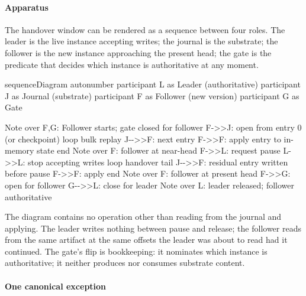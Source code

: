 \documentclass[
]{article}
\newenvironment{Shaded}{}{}
\newcommand{\NormalTok}[1]{#1}
\begin{document}
\paragraph{Apparatus}\label{apparatus}

The handover window can be rendered as a sequence between four roles.
The leader is the live instance accepting writes; the journal is the
substrate; the follower is the new instance approaching the present
head; the gate is the predicate that decides which instance is
authoritative at any moment.

\begin{Shaded}
\begin{Highlighting}[]
\NormalTok{sequenceDiagram}
\NormalTok{    autonumber}
\NormalTok{    participant L as Leader (authoritative)}
\NormalTok{    participant J as Journal (substrate)}
\NormalTok{    participant F as Follower (new version)}
\NormalTok{    participant G as Gate}

\NormalTok{    Note over F,G: Follower starts; gate closed for follower}
\NormalTok{    F{-}\textgreater{}\textgreater{}J: open from entry 0 (or checkpoint)}
\NormalTok{    loop bulk replay}
\NormalTok{        J{-}{-}\textgreater{}\textgreater{}F: next entry}
\NormalTok{        F{-}\textgreater{}\textgreater{}F: apply entry to in{-}memory state}
\NormalTok{    end}
\NormalTok{    Note over F: follower at near{-}head}
\NormalTok{    F{-}\textgreater{}\textgreater{}L: request pause}
\NormalTok{    L{-}\textgreater{}\textgreater{}L: stop accepting writes}
\NormalTok{    loop handover tail}
\NormalTok{        J{-}{-}\textgreater{}\textgreater{}F: residual entry written before pause}
\NormalTok{        F{-}\textgreater{}\textgreater{}F: apply}
\NormalTok{    end}
\NormalTok{    Note over F: follower at present head}
\NormalTok{    F{-}\textgreater{}\textgreater{}G: open for follower}
\NormalTok{    G{-}{-}\textgreater{}\textgreater{}L: close for leader}
\NormalTok{    Note over L: leader released; follower authoritative}
\end{Highlighting}
\end{Shaded}

The diagram contains no operation other than reading from the journal
and applying. The leader writes nothing between pause and release; the
follower reads from the same artifact at the same offsets the leader was
about to read had it continued. The gate's flip is bookkeeping: it
nominates which instance is authoritative; it neither produces nor
consumes substrate content.

\paragraph{One canonical exception}\label{one-canonical-exception}
\end{document}
